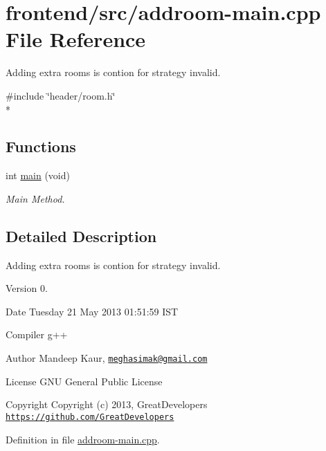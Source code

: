 \hypertarget{addroom-main_8cpp}{\section{frontend/src/addroom-\/main.cpp File Reference}
\label{addroom-main_8cpp}
}


Adding extra rooms is contion for strategy invalid.  


{\ttfamily \#include \char`\"{}header/room.\-h\char`\"{}}\\*
\subsection*{Functions}
\begin{DoxyCompactItemize}
\item 
int \hyperlink{addroom-main_8cpp_a568b3afc214ba30be5bf526d6b27b611}{main} (void)
\begin{DoxyCompactList}\small\item\em Main Method. \end{DoxyCompactList}\end{DoxyCompactItemize}


\subsection{Detailed Description}
Adding extra rooms is contion for strategy invalid. \begin{DoxyVersion}{Version}
0. 
\end{DoxyVersion}
\begin{DoxyDate}{Date}
Tuesday 21 May 2013 01\-:51\-:59 I\-S\-T\par
 Compiler g++
\end{DoxyDate}
\begin{DoxyAuthor}{Author}
Mandeep Kaur, \href{mailto:meghasimak@gmail.com}{\tt meghasimak@gmail.\-com}\par
 License G\-N\-U General Public License 
\end{DoxyAuthor}
\begin{DoxyCopyright}{Copyright}
Copyright (c) 2013, Great\-Developers \href{https://github.com/GreatDevelopers}{\tt https\-://github.\-com/\-Great\-Developers} 
\end{DoxyCopyright}


Definition in file \hyperlink{addroom-main_8cpp_source}{addroom-\/main.\-cpp}.



